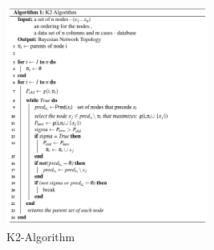 \begin{frame}

\begin{figure}[!h]
            \centering
            \includegraphics[height=72mm]{figuras/K2.png}
            \caption{K2-Algorithm}
            \label{fig:k2}
        \end{figure}
  
\end{frame}





